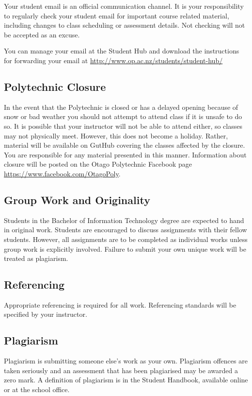 \documentclass{article}
\begin{document}
Your student email is an official communication channel. It is your responsibility to regularly check your student email for important course related material, including changes to class scheduling or assessment details. Not checking will not be accepted as an excuse.

You can manage your email at the Student Hub and download the instructions for forwarding your email at \url{http://www.op.ac.nz/students/student-hub/}

\subsection*{Polytechnic Closure}
In the event that the Polytechnic is closed or has a delayed opening because of snow or bad weather you should not attempt to attend class if it is unsafe to do so. It is possible that your instructor will not be able to attend either, so classes may not physically meet. However, this does not become a holiday. Rather, material will be available on GutHub covering the classes affected by the closure. You are responsible for any material presented in this manner. Information about closure will be posted on the Otago Polytechnic Facebook page \url{https://www.facebook.com/OtagoPoly}.

\subsection*{Group Work and Originality}
Students in the Bachelor of Information Technology degree are expected to hand in original work.  Students are encouraged to discuss
assignments with their fellow students.  However, all assignments are to be completed as individual works unless group work is explicitly involved.
Failure to submit your own unique work will be treated as plagiarism.

\subsection*{Referencing}
Appropriate referencing is required for all work.  Referencing standards will be specified by your instructor.

\subsection*{Plagiarism}
Plagiarism is submitting someone else's work as your own.  Plagiarism offences are taken seriously and an
assessment that has been plagiarised may be awarded a zero mark.  A definition of plagiarism is in the Student Handbook,
available online or at the school office.
\end{document}
